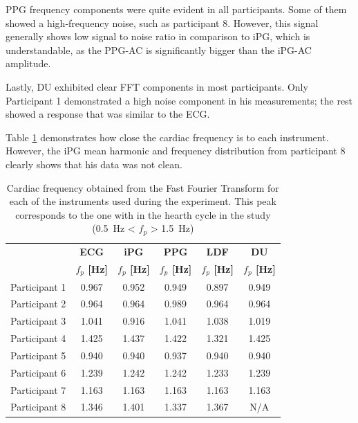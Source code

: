 PPG frequency components were quite evident in all participants. Some of them showed a high-frequency noise, such as participant 8. However, this signal generally shows low signal to noise ratio in comparison to iPG, which is understandable, as the PPG-AC is significantly bigger than the iPG-AC amplitude.

Lastly, DU exhibited clear FFT components in most participants. Only Participant 1 demonstrated a high noise component in his measurements; the rest showed a response that was similar to the ECG. 

Table \ref{tbl:fft} demonstrates how close the cardiac frequency is to each instrument. However, the iPG mean harmonic and frequency distribution from participant 8 clearly shows that his data was not clean.


\begin{table}[!htbp]
	\caption[Peak frequency obtained from Fast Fourier Transform]{Cardiac frequency obtained from the Fast Fourier Transform for each of the instruments used during the experiment. This peak corresponds to the one with in the hearth cycle in the study (\SI{0.5}{\hertz} < $f_p$ > \SI{1.5}{\hertz})}
	\label{tbl:fft}
	\centering 
	\begin{tabular}{lccccc}
		\toprule
		& \textbf{ECG}
		& \textbf{iPG}
		& \textbf{PPG}
		& \textbf{LDF}
		& \textbf{DU} \\
		& \textbf{$f_p$ [\si{\hertz}]}		
		& \textbf{$f_p$ [\si{\hertz}]}		
		& \textbf{$f_p$ [\si{\hertz}]}
		& \textbf{$f_p$ [\si{\hertz}]}
		& \textbf{$f_p$ [\si{\hertz}]}\\\midrule
		Participant 1    &     0.967    &     0.952    &     0.949    &     0.897    &     0.949    \\  
		Participant 2    &     0.964    &     0.964    &     0.989    &     0.964    &     0.964    \\  
		Participant 3    &     1.041    &     0.916    &     1.041    &     1.038    &     1.019    \\  
		Participant 4    &     1.425    &     1.437    &     1.422    &     1.321    &     1.425    \\  
		Participant 5    &     0.940    &     0.940    &     0.937    &     0.940    &     0.940    \\  
		Participant 6    &     1.239    &     1.242    &     1.242    &     1.233    &     1.239    \\  
		Participant 7    &     1.163    &     1.163    &     1.163    &     1.163    &     1.163    \\  
		Participant 8    &     1.346    &     1.401    &     1.337    &     1.367    &     N/A    \\  
		
		\bottomrule
	\end{tabular}
\end{table}

